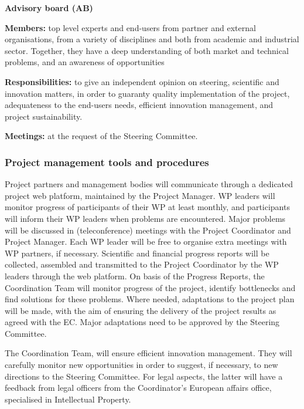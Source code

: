 \begin{description}
\item{\textbf{Advisory board (AB)}} \nobreak\par

  \textbf{Members:} top level experts and end-users from partner and
  external organisations, from a variety of disciplines and both from
  academic and industrial sector. Together, they have a deep
  understanding of both market and technical problems, and an
  awareness of opportunities

  \textbf{Responsibilities:} to give an independent opinion on
  steering, scientific and innovation matters, in order to guaranty
  quality implementation of the project, adequateness to the end-users
  needs, efficient innovation management, and project sustainability.


  \textbf{Meetings:} at the request of the Steering Committee.
\end{description}

\subsubsection{Project management tools and procedures}

Project partners and management bodies will communicate through
a dedicated project web platform, maintained by the Project
Manager. WP leaders will monitor progress of
participants of their WP at least monthly, and participants will inform their WP
leaders when problems are encountered. Major problems will be
discussed in (teleconference) meetings with the Project Coordinator
and Project Manager. Each WP leader will be free to organise
extra meetings with WP partners, if necessary. Scientific and
financial progress reports will be collected, assembled and
transmitted to the Project Coordinator by the WP leaders through the
web platform. On basis of the Progress Reports, the Coordination Team
will monitor progress of the project, identify bottlenecks and find
solutions for these problems. Where needed, adaptations to the project
plan will be made, with the aim of ensuring the delivery of the project
results as agreed with the EC. Major adaptations need to be approved
by the Steering Committee.

The Coordination Team, will ensure efficient innovation management.
They will carefully monitor new opportunities in order to suggest, if
necessary, to new directions to the Steering Committee. For legal
aspects, the latter will have a feedback from legal officers from the
Coordinator’s European affairs office,
specialised in Intellectual Property.


